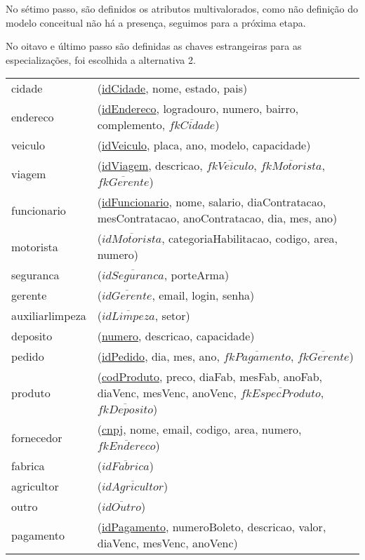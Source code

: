 \documentclass[12pt, onecolumn, titlepage]{article}
\begin{document}
No sétimo passo, são definidos os atributos multivalorados, como não definição do modelo conceitual não há a presença, seguimos para a próxima etapa.

No oitavo e último passo são definidas as chaves estrangeiras para as especializações, foi escolhida a alternativa 2.

\begin{table}[htb!]
\begin{center}
\begin{tabular}{p{2.5cm} p{10.5cm}}
cidade & (\underline{idCidade}, nome, estado, pais) \\
endereco & (\underline{idEndereco}, logradouro, numero, bairro, complemento, $\overline{fkCidade}$) \\
veiculo & (\underline{idVeiculo}, placa, ano, modelo, capacidade) \\
viagem & (\underline{idViagem}, descricao, $\overline{fkVeiculo}$, $\overline{fkMotorista}$, $\overline{fkGerente}$) \\
funcionario & (\underline{idFuncionario}, nome, salario, diaContratacao, mesContratacao, anoContratacao, dia, mes, ano)\\
motorista & (\underline{$\overline{idMotorista}$}, categoriaHabilitacao, codigo, area, numero)\\
seguranca & (\underline{$\overline{idSeguranca}$}, porteArma)\\
gerente & (\underline{$\overline{idGerente}$}, email, login, senha)\\
auxiliarlimpeza & (\underline{$\overline{idLimpeza}$}, setor)\\
deposito & (\underline{numero}, descricao, capacidade)\\
pedido & (\underline{idPedido}, dia, mes, ano, $\overline{fkPagamento}$, $\overline{fkGerente}$)\\
produto & (\underline{codProduto}, preco, diaFab, mesFab, anoFab, diaVenc, mesVenc, anoVenc, $\overline{fkEspecProduto}$, $\overline{fkDeposito}$)\\
fornecedor & (\underline{cnpj}, nome, email, codigo, area, numero, $\overline{fkEndereco}$)\\
fabrica & (\underline{$\overline{idFabrica}$})\\
agricultor & (\underline{$\overline{idAgricultor}$})\\
outro & (\underline{$\overline{idOutro}$})\\
pagamento & (\underline{idPagamento}, numeroBoleto, descricao, valor, diaVenc, mesVenc, anoVenc)\\

\end{tabular}
\end{center}
\end{table}
\end{document}
